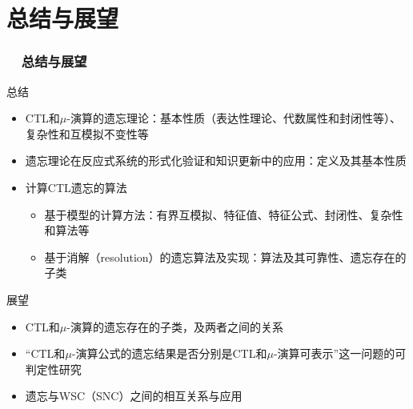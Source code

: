 \documentclass[aspectratio=1610, 9pt, CJK]{beamer}
\begin{document}
	
	\section{总结与展望}
	\begin{frame}
		\frametitle{~~总结与展望}
		\begin{block}{总结}
		\begin{itemize}%
			\item CTL和$\mu$-演算的遗忘理论：基本性质（表达性理论、代数属性和封闭性等）、复杂性和互模拟不变性等
			\item 遗忘理论在反应式系统的形式化验证和知识更新中的应用：定义及其基本性质
			\item 计算CTL遗忘的算法
			\begin{itemize}
				\item 基于模型的计算方法：有界互模拟、特征值、特征公式、封闭性、复杂性和算法等
				\item 基于消解（resolution）的遗忘算法及实现：算法及其可靠性、遗忘存在的子类
			\end{itemize}
		\end{itemize}
		\end{block}
	
		\begin{block}{展望}
			\begin{itemize}
				\item CTL和$\mu$-演算的遗忘存在的子类，及两者之间的关系
				\item “CTL和$\mu$-演算公式的遗忘结果是否分别是CTL和$\mu$-演算可表示”这一问题的可判定性研究
				\item 遗忘与WSC（SNC）之间的相互关系与应用
			\end{itemize}
		\end{block}	
	\end{frame}
	
\end{document}
